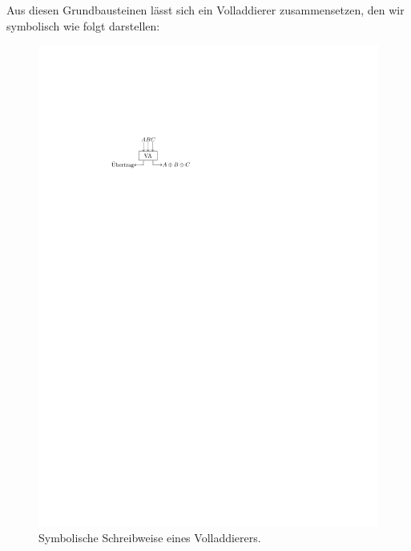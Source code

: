Aus diesen Grundbausteinen l\"{a}sst sich ein Volladdierer zusammensetzen, 
den wir symbolisch wie folgt darstellen:
\begin{figure}[h]
\centering
\includegraphics[scale=0.8]{bilder/Volladdierer.pdf}
\caption{Symbolische Schreibweise eines Volladdierers.}
\end{figure}

